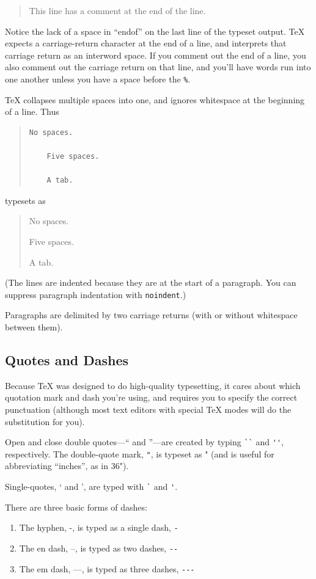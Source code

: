 \documentclass{icmmcm}
\newcommand{\bslash}{\symbol{'134}}%
\newcommand{\bsl}{{\texttt{\bslash}}}
\newcommand{\command}[1]{\texttt{\bsl{}#1}\xspace}
\newcommand{\tex}{\TeX\xspace}
\begin{document}
{\begin{quote}
This line has a comment at the end%
of the line.
\end{quote}

Notice the lack of a space in ``endof'' on the last line of the
typeset output.  \tex expects a carriage-return character at the end
of a line, and interprets that carriage return as an interword space.
If you comment out the end of a line, you also comment out the
carriage return on that line, and you'll have words run into one
another unless you have a space before the \verb+%+.

\tex collapses multiple spaces into one, and ignores whitespace at the
beginning of a line.  Thus
\begin{quote}
\begin{verbatim}
No spaces.

    Five spaces.

    A tab.
\end{verbatim}
\end{quote}
typesets as
\begin{quote}
No spaces.

    Five spaces.

    A tab.
\end{quote}

(The lines are indented because they are at the start of a paragraph.
You can suppress paragraph indentation with \command{noindent}.)

Paragraphs are delimited by two carriage returns (with or without
whitespace between them).


\subsection{Quotes and Dashes}

Because \tex was designed to do high-quality typesetting, it cares
about which quotation mark and dash you're using, and requires you to
specify the correct punctuation (although most text editors with
special \tex modes will do the substitution for you).

Open and close double quotes---`` and ''---are created by typing
\verb+``+ and \verb+''+, respectively.  The double-quote mark,
\verb+"+, is typeset as " (and is useful for abbreviating ``inches'',
as in 36").

Single-quotes, ` and ', are typed with \verb+`+ and \verb+'+.

There are three basic forms of dashes:
\begin{enumerate}
\item The hyphen, -, is typed as a single dash, \verb+-+
\item The en dash, --, is typed as two dashes, \verb+--+
\item The em dash, ---, is typed as three dashes, \verb+---+
\end{enumerate}

}
\end{document}
